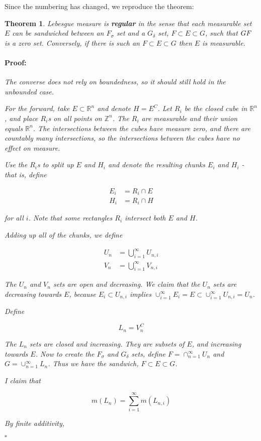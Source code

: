 \documentclass{article}
\newenvironment{proof}{\paragraph{Proof:}}{\hfill$\square$}
\newtheorem{theorem}{Theorem}
\newcommand{\R}{\mathbb{R}}
\newcommand{\Z}{\mathbb{Z}}
\begin{document}
Since the numbering has changed, we reproduce the theorem:

\begin{theorem}
Lebesgue measure is \textbf{regular} in the sense that each measurable set $E$ can be sandwiched between an $F_\sigma$ set and a $G_\delta$ set, $F \subset E \subset G$, such that $G \\ F$ is a zero set. Conversely, if there is such an $F \subset E \subset G$ then $E$ is measurable.

\begin{proof}
The converse does not rely on boundedness, so it should still hold in the unbounded case.

For the forward, take $E \subset \R^n$ and denote $H = E^C$. Let $R_i$ be the closed cube in $\R^n$, and place $R_i$s on all points on $\Z^n$. The $R_i$ are measurable and their union equals $\R^n$. The intersections between the cubes have measure zero, and there are countably many intersections, so the intersections between the cubes have no effect on measure.

Use the $R_i$s to split up $E$ and $H_i$ and denote the resulting chunks $E_i$ and $H_i$ - that is, define

\begin{align*}
E_i &= R_i \cap E \\
H_i &= R_i \cap H
\end{align*}

for all $i$. Note that some rectangles $R_i$ intersect both $E$ and $H$.






Adding up all of the chunks, we define

\begin{align*}
U_n &= \bigcup_{i=1}^{\infty} U_{n, i} \\
V_n &= \bigcup_{i=1}^{\infty} V_{n, i}
\end{align*}

The $U_n$ and $V_n$ sets are open and decreasing. We claim that the $U_n$ sets are decreasing towards $E$, because $E_i \subset U_{n, i}$ implies $\cup_{i=1}^\infty E_i = E \subset \cup_{i=1}^\infty U_{n, i} = U_n$.

Define

\[
L_n = V_n^C
\]

The $L_n$ sets are closed and increasing. They are subsets of $E$, and increasing towards $E$. Now to create the $F_\sigma$ and $G_\delta$ sets, define $F = \cap_{n=1}^\infty U_n$ and $G = \cup_{n=1}^\infty L_n$. Thus we have the sandwich, $F \subset E \subset G$.

I claim that

\[
m(L_n) = \sum_{i=1}^{\infty} m(L_{n, i})
\]

By finite additivity, 

\end{proof}
\end{theorem}
\end{document}
